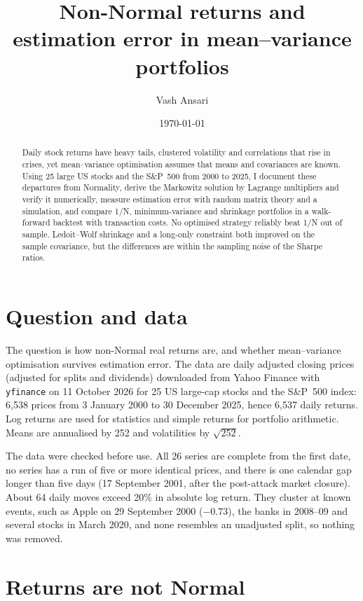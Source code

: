 \documentclass[11pt,a4paper]{article}
\title{Non-Normal returns and estimation error in mean--variance portfolios}
\author{Vash Ansari}
\date{\today}
\begin{document}
\maketitle

\begin{abstract}
\noindent
Daily stock returns have heavy tails, clustered volatility and correlations that rise in crises, yet
mean--variance optimisation assumes that means and covariances are known. Using 25 large US stocks and
the S\&P~500 from 2000 to 2025, I document these departures from Normality, derive the Markowitz
solution by Lagrange multipliers and verify it numerically, measure estimation error with random matrix
theory and a simulation, and compare 1/N, minimum-variance and shrinkage portfolios in a walk-forward
backtest with transaction costs. No optimised strategy reliably beat 1/N out of sample. Ledoit--Wolf
shrinkage and a long-only constraint both improved on the sample covariance, but the differences are
within the sampling noise of the Sharpe ratios.
\end{abstract}

\section{Question and data}
The question is how non-Normal real returns are, and whether mean--variance optimisation survives
estimation error. The data are daily adjusted closing prices (adjusted for splits and dividends)
downloaded from Yahoo Finance with \texttt{yfinance} on 11 October 2026 for 25 US large-cap
stocks and the S\&P~500 index: 6{,}538 prices from 3 January 2000 to 30 December 2025, hence 6{,}537
daily returns. Log returns are used for statistics and simple returns for portfolio arithmetic.
Means are annualised by 252 and volatilities by $\sqrt{252}$.

The data were checked before use. All 26 series are complete from the first date, no series has a run of
five or more identical prices, and there is one calendar gap longer than five days (17 September 2001,
after the post-attack market closure). About 64 daily moves exceed 20\% in absolute log return. They
cluster at known events, such as Apple on 29 September 2000 ($-0.73$), the banks in 2008--09 and several
stocks in March 2020, and none resembles an unadjusted split, so nothing was removed.

\section{Returns are not Normal}
\end{document}
